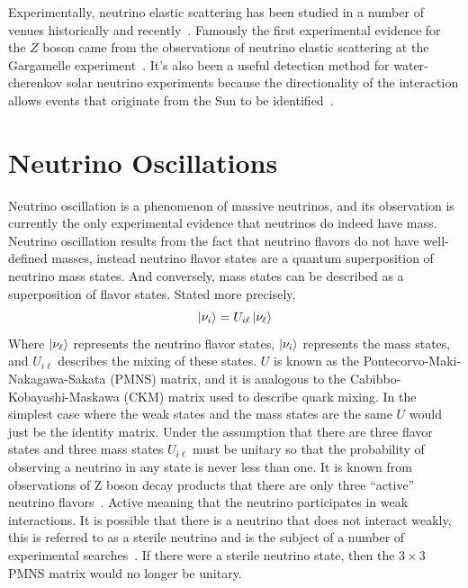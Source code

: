 Experimentally, neutrino elastic scattering has been studied in a number
of venues historically and recently~\citep{reines2, es_measurement, nutev}.
Famously the first experimental evidence for the $Z$ boson came from
the observations of neutrino elastic scattering at the
Gargamelle experiment~\citep{gargamelle}.
It's also been a useful detection method for water-cherenkov solar
neutrino experiments because the directionality of the interaction
allows events that originate from the Sun to be identified~\citep{sno_first,
kamiokande, superk_first_solar}.

\section{Neutrino Oscillations}
\label{sec:neut_osc}
Neutrino oscillation is a phenomenon of massive neutrinos, and its observation
is currently the only experimental evidence that neutrinos do indeed have mass.
Neutrino oscillation results from the fact that neutrino flavors do not have
well-defined masses, instead neutrino flavor states are a quantum superposition
of neutrino mass states.
And conversely, mass states can be described as a superposition of flavor states.
Stated more precisely,
\begin{equation}
    \ket{\nu_{i}} = U_{i\ell}\ket{\nu_\ell}
\end{equation}
Where $\ket{\nu_\ell}$ represents the neutrino flavor states, $\ket{\nu_i}$
represents the mass states, and $U_{i\ell}$ describes the mixing of these
states.
$U$ is known as the Pontecorvo-Maki-Nakagawa-Sakata (PMNS) matrix,
and it is analogous to the Cabibbo-Kobayashi-Maskawa (CKM) matrix used
to describe quark mixing.
In the simplest case where the weak states and the mass states are the same
$U$ would just be the identity matrix.
Under the assumption that there are three flavor states and three mass states
$U_{i\ell}$ must be unitary so that the probability of observing
a neutrino in any state is never less than one.
It is known from observations of Z boson decay products that
there are only three ``active'' neutrino flavors~\citep{Zdecay}.
Active  meaning that the neutrino participates in
weak interactions.
It is possible that there is a neutrino that does not interact
weakly, this is referred to as a sterile neutrino and is the
subject of a number of experimental searches~\citep{prospect, lsnd, miniboone, jsns2}.
If there were a sterile neutrino state, then the $3\times3$ PMNS matrix would
no longer be unitary.

